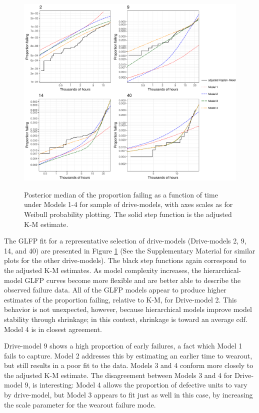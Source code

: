 \documentclass[12pt]{article}
\begin{document}
\begin{figure}[H]
{\centering
\includegraphics[width=\textwidth]{single-drive-4-Models-ex-v2}}
\caption{Posterior median of the proportion failing as a function of time under Models 1-4 for sample of drive-models, with axes scales as for Weibull probability plotting.  The solid step function is the adjusted K-M estimate.}
\label{fig:mod_comp_leg}
\end{figure}

The GLFP fit for a representative selection of drive-models (Drive-models 2, 9, 14, and 40) are presented in Figure \ref{fig:mod_comp_leg} (See the Supplementary Material for similar plots for the other drive-models).  The black step functions again correspond to the adjusted K-M estimates.  As model complexity increases, the hierarchical-model GLFP curves become more flexible and are better able to describe the observed failure data.  All of the GLFP models appear to produce higher estimates of the proportion failing, relative to K-M, for Drive-model 2. This behavior is not unexpected, however, because hierarchical models improve model stability through shrinkage; in this context, shrinkage is toward an average cdf. Model 4 is in closest agreement. 

Drive-model 9 shows a high proportion of early failures, a fact which Model 1 fails to capture. Model 2 addresses this by estimating an earlier time to wearout, but still results in a poor fit to the data. Models 3 and 4 conform more closely to the adjusted K-M estimate. The disagreement between Models 3 and 4 for Drive-model 9, is interesting: Model 4 allows the proportion of defective units to vary by drive-model, but Model 3 appears to fit just as well in this case, by increasing the scale parameter for the wearout failure mode.
\end{document}
